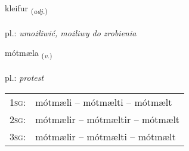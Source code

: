 \documentclass[frontgrid, backgrid]{flacards}\usepackage[]{graphicx}\usepackage[]{xcolor}
\begin{document}
\renewcommand{\flhead}{\vskip5pt \fboxsep=0pt {\small\bfseries\footnotesize Lýsingarorð | Adjective}}
\renewcommand{\fcfoot}{\vskip5pt \fboxsep=0pt \hspace{2pt}{\small\bfseries\footnotesize 2K}}

\renewcommand{\blhead}{\vskip5pt {\small\bfseries\footnotesize Lýsingarorð | Adjective }}
\renewcommand{\bcfoot}{\vskip5pt \hspace{2pt}{\small\bfseries\footnotesize 2K}}


{kleifur \small{\textsubscript{(\textit{adj.})}} \\[1ex] %
\textphonetic{[kʰleiːvʏr]} \\
pl.: \emph{umożliwić, możliwy do zrobienia} \\  [2ex]
\renewcommand*{\arraystretch}{0.8}
}

\renewcommand{\flhead}{\vskip5pt \fboxsep=0pt {\small\bfseries\footnotesize Sagnorð | Verb}}
\renewcommand{\fcfoot}{\vskip5pt \fboxsep=0pt \hspace{2pt}{\small\bfseries\footnotesize 2K}}

\renewcommand{\blhead}{\vskip5pt {\small\bfseries\footnotesize Sagnorð | Verb }}
\renewcommand{\bcfoot}{\vskip5pt \hspace{2pt}{\small\bfseries\footnotesize 2K}}


{mótmæla \small{\textsubscript{(\textit{v.})}} \\[1ex] %
\textphonetic{[moutmaila]} \\
pl.: \emph{protest} \\  [2ex]
\renewcommand*{\arraystretch}{0.8}
\begin{tabular}{p{1cm}l}
\textsc{1sg}: & mótmæli -- mótmælti -- mótmælt \\ 
\textsc{2sg}: & mótmælir -- mótmæltir -- mótmælt \\ 
\textsc{3sg}: & mótmælir -- mótmælti -- mótmælt \\ 
\end{tabular}
}
\end{document}
